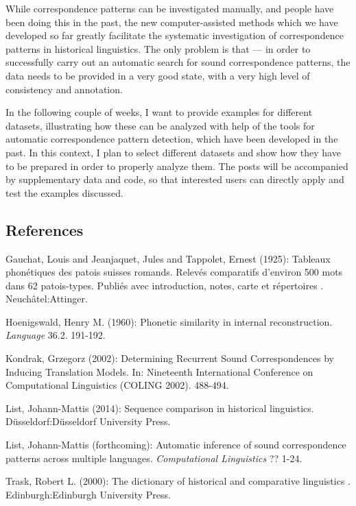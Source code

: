 \documentclass[
  a4paper,
  14pt,
  oneside,
  tablecaptionabove
]{scrbook}
\begin{document}
While correspondence patterns can be investigated manually, and people
have been doing this in the past, the new computer-assisted methods
which we have developed so far greatly facilitate the systematic
investigation of correspondence patterns in historical linguistics. The
only problem is that --- in order to successfully carry out an automatic
search for sound correspondence patterns, the data needs to be provided
in a very good state, with a very high level of consistency and
annotation.

In the following couple of weeks, I want to provide examples for
different datasets, illustrating how these can be analyzed with help of
the tools for automatic correspondence pattern detection, which have
been developed in the past. In this context, I plan to select different
datasets and show how they have to be prepared in order to properly
analyze them. The posts will be accompanied by supplementary data and
code, so that interested users can directly apply and test the examples
discussed.

\subsection*{References}

\nopagebreak\hangindent=0.7cm {\small Gauchat, Louis and Jeanjaquet, Jules and Tappolet, Ernest (1925):
Tableaux phonétiques des patois suisses romands. Relevés comparatifs
d'environ 500 mots dans 62 patois-types. Publiés avec introduction,
notes, carte et répertoires . Neuchâtel:Attinger. }

\nopagebreak\hangindent=0.7cm {\small Hoenigswald, Henry M. (1960): Phonetic similarity in internal
reconstruction. \emph{Language} 36.2. 191-192. }

\nopagebreak\hangindent=0.7cm {\small Kondrak, Grzegorz (2002): Determining Recurrent Sound
Correspondences by Inducing Translation Models. In: Nineteenth
International Conference on Computational Linguistics (COLING 2002).
488-494. }

\nopagebreak\hangindent=0.7cm {\small List, Johann-Mattis (2014): Sequence comparison in historical
linguistics. Düsseldorf:Düsseldorf University Press. }

\nopagebreak\hangindent=0.7cm {\small List, Johann-Mattis (forthcoming): Automatic inference of sound
correspondence patterns across multiple languages. \emph{Computational
Linguistics} ?? 1-24. }

\nopagebreak\hangindent=0.7cm {\small Trask, Robert L. (2000): The dictionary of historical and
comparative linguistics . Edinburgh:Edinburgh University Press. }
\end{document}
